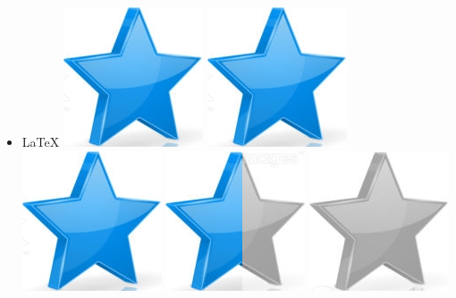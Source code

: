 \documentclass[10pt,a4paper,sans]{article}
\begin{document}
\begin{minipage}[t]{0.28\textwidth}
\begin{mdframed}[style=cadreCompetences]
\begin{itemize}
                \item{LaTeX
                    \hfill
                    \includegraphics[scale=0.25]{img/star.png} \hspace{-0.22cm}
                    \includegraphics[scale=0.25]{img/star.png} \hspace{-0.22cm}
                    \includegraphics[scale=0.25]{img/star.png} \hspace{-0.22cm}
                    \includegraphics[scale=0.25]{img/half_star.png} \hspace{-0.22cm}
                    \includegraphics[scale=0.25]{img/empty_star.png}}
            \end{itemize}


\end{mdframed}
\end{minipage}
\end{document}
